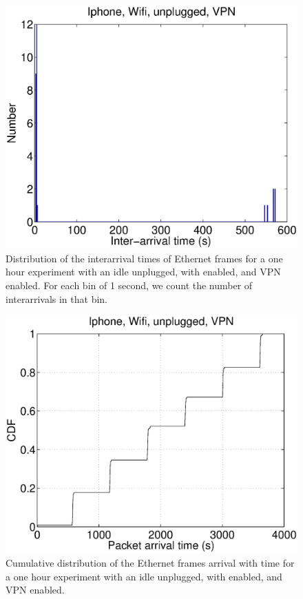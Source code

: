 \begin{figure}
\centering
        \includegraphics[width=0.8\linewidth]{../../code/pushNotification/Fig/bw_iphone_wifi_unplug_vpn_interTs.eps}
  \caption{Distribution of the interarrival times of Ethernet frames
    for a one hour experiment with an idle \iphone{} unplugged, with \wifi{}
    enabled, and VPN enabled. For each bin of 1 second, we count
    the number of interarrivals in that bin.}
  \label{fig:push_wv_interTs}
\end{figure}

\begin{figure}
\centering
        \includegraphics[width=0.8\linewidth]{../../code/pushNotification/Fig/bw_iphone_wifi_unplug_vpn_ts.eps}
  \caption{Cumulative distribution of the Ethernet frames
          arrival with time for a one hour experiment with an idle
          \iphone{} unplugged, with \wifi{} enabled, and VPN
          enabled.}
  \label{fig:push_wv_ts}
\end{figure}





